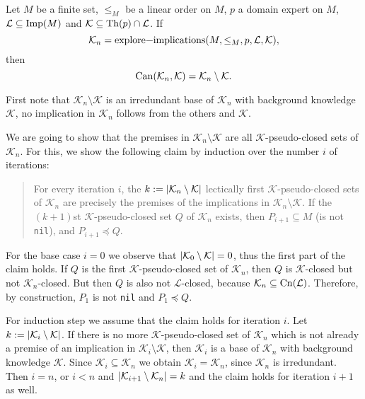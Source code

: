 \begin{Theorem}
  \label{thm:explore-implications-computes-canonical-base}
  Let $M$ be a finite set, $\leq_{M}$ be a linear order on $M$, $p$ a domain expert on
  $M$, $\mathcal{L} \subseteq \operatorname{Imp}(M)$ and $\mathcal{K} \subseteq \operatorname{Th}(p) \cap
  \mathcal{L}$.  If
  \begin{equation*}
    \mathcal{K}_{n} = \text{\lstinline{explore-implications}}(M, \leq_{M}, p, \mathcal{L}, \mathcal{K}),
  \end{equation*}
  then
  \begin{equation*}
    \operatorname{Can}(\mathcal{K}_{n}, \mathcal{K}) = \mathcal{K}_{n} \setminus \mathcal{K}.
  \end{equation*}
\end{Theorem}
\begin{Proof}
  First note that $\mathcal{K}_{n} \setminus \mathcal{K}$ is an irredundant base of
  $\mathcal{K}_{n}$ with background knowledge $\mathcal{K}$, \ie no implication in
  $\mathcal{K}_{n}$ follows from the others and $\mathcal{K}$.

  We are going to show that the premises in $\mathcal{K}_{n} \setminus \mathcal{K}$ are
  all $\mathcal{K}$-pseudo-closed sets of $\mathcal{K}_{n}$.  For this, we show the
  following claim by induction over the number $i$ of iterations:
  \begin{quote}
    For every iteration $i$, the $k := \lvert \mathcal{K}_{n} \setminus \mathcal{K} \rvert$
    lectically first $\mathcal{K}$-pseudo-closed sets of $\mathcal{K}_{n}$ are precisely
    the premises of the implications in $\mathcal{K}_{n} \setminus \mathcal{K}$.  If the
    $(k+1)$st $\mathcal{K}$-pseudo-closed set $Q$ of $\mathcal{K}_{n}$ exists, then
    $P_{i+1} \subseteq M$ (\ie is not \lstinline{nil}), and $P_{i+1} \preceq Q$.
  \end{quote}

  For the base case $i = 0$ we observe that $\lvert \mathcal{K}_{0} \setminus \mathcal{K} \rvert
  = 0$, thus the first part of the claim holds.  If $Q$ is the first
  $\mathcal{K}$-pseudo-closed set of $\mathcal{K}_{n}$, then $Q$ is $\mathcal{K}$-closed
  but not $\mathcal{K}_{n}$-closed.  But then $Q$ is also not $\mathcal{L}$-closed,
  because $\mathcal{K}_{n} \subseteq \operatorname{Cn}(\mathcal{L})$.  Therefore, by construction,
  $P_{1}$ is not \lstinline{nil} and $P_{1} \preceq Q$.

  For induction step we assume that the claim holds for iteration $i$.  Let $k := \lvert
    \mathcal{K}_{i} \setminus \mathcal{K} \rvert$.  If there is no more
  $\mathcal{K}$-pseudo-closed set of $\mathcal{K}_{n}$ which is not already a premise of
  an implication in $\mathcal{K}_{i} \setminus \mathcal{K}$, then $\mathcal{K}_{i}$ is a
  base of $\mathcal{K}_{n}$ with background knowledge $\mathcal{K}$.  Since
  $\mathcal{K}_{i} \subseteq \mathcal{K}_{n}$ we obtain $\mathcal{K}_{i} =
  \mathcal{K}_{n}$, since $\mathcal{K}_{n}$ is irredundant.  Then $i = n$, or $i < n$ and
  $\lvert \mathcal{K}_{i+1} \setminus \mathcal{K}_{n} \rvert = k$ and the claim holds for
  iteration $i+1$ as well.


\end{Proof}
